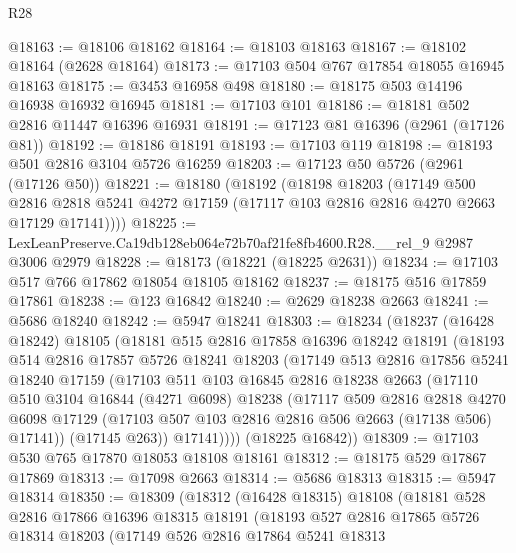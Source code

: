 \begin{lexlean}{R28}
\begin{coremodule}
@18163 := @18106 @18162
@18164 := @18103 @18163
@18167 := @18102 @18164 (@2628 @18164)
@18173 := @17103 @504 @767 @17854 @18055 @16945 @18163
@18175 := @3453 @16958 @498
@18180 := @18175 @503 @14196 @16938 @16932 @16945
@18181 := @17103 @101
@18186 := @18181 @502 @2816 @11447 @16396 @16931
@18191 := @17123 @81 @16396 (@2961 (@17126 @81))
@18192 := @18186 @18191
@18193 := @17103 @119
@18198 := @18193 @501 @2816 @3104 @5726 @16259
@18203 := @17123 @50 @5726 (@2961 (@17126 @50))
@18221 := @18180
    (@18192
      (@18198
        @18203
        (@17149
          @500
          @2816
          @2818
          @5241
          @4272
          @17159
          (@17117 @103 @2816 @2816 @4270 @2663 @17129 @17141))))
@18225 := LexLeanPreserve.Ca19db128eb064e72b70af21fe8fb4600.R28.__rel_9 @2987 @3006 @2979
@18228 := @18173 (@18221 (@18225 @2631))
@18234 := @17103 @517 @766 @17862 @18054 @18105 @18162
@18237 := @18175 @516 @17859 @17861
@18238 := @123 @16842
@18240 := @2629 @18238 @2663
@18241 := @5686 @18240
@18242 := @5947 @18241
@18303 := @18234
    (@18237
      (@16428 @18242)
      @18105
      (@18181
        @515
        @2816
        @17858
        @16396
        @18242
        @18191
        (@18193
          @514
          @2816
          @17857
          @5726
          @18241
          @18203
          (@17149
            @513
            @2816
            @17856
            @5241
            @18240
            @17159
            (@17103
              @511
              @103
              @16845
              @2816
              @18238
              @2663
              (@17110
                @510
                @3104
                @16844
                (@4271 @6098)
                @18238
                (@17117
                  @509
                  @2816
                  @2818
                  @4270
                  @6098
                  @17129
                  (@17103 @507 @103 @2816 @2816 @506 @2663 (@17138 @506) @17141))
                (@17145 @263))
              @17141))))
      (@18225 @16842))
@18309 := @17103 @530 @765 @17870 @18053 @18108 @18161
@18312 := @18175 @529 @17867 @17869
@18313 := @17098 @2663
@18314 := @5686 @18313
@18315 := @5947 @18314
@18350 := @18309
    (@18312
      (@16428 @18315)
      @18108
      (@18181
        @528
        @2816
        @17866
        @16396
        @18315
        @18191
        (@18193
          @527
          @2816
          @17865
          @5726
          @18314
          @18203
          (@17149
            @526
            @2816
            @17864
            @5241
            @18313

\end{coremodule}
\end{lexlean}
